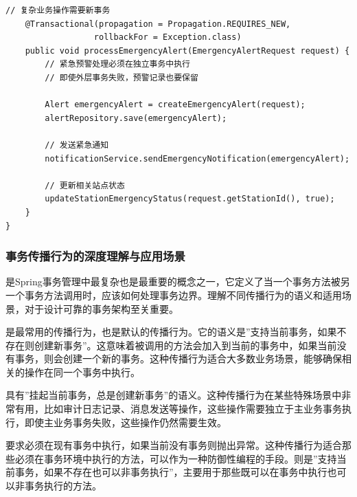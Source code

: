 \begin{lstlisting}[style=java]
    // 复杂业务操作需要新事务
    @Transactional(propagation = Propagation.REQUIRES_NEW, 
                  rollbackFor = Exception.class)
    public void processEmergencyAlert(EmergencyAlertRequest request) {
        // 紧急预警处理必须在独立事务中执行
        // 即使外层事务失败，预警记录也要保留
        
        Alert emergencyAlert = createEmergencyAlert(request);
        alertRepository.save(emergencyAlert);
        
        // 发送紧急通知
        notificationService.sendEmergencyNotification(emergencyAlert);
        
        // 更新相关站点状态
        updateStationEmergencyStatus(request.getStationId(), true);
    }
}
\end{lstlisting}

\hypertarget{ux4e8bux52a1ux4f20ux64adux884cux4e3aux7684ux6df1ux5ea6ux7406ux89e3ux4e0eux5e94ux7528ux573aux666f}{%
\subsubsection{事务传播行为的深度理解与应用场景}\label{ux4e8bux52a1ux4f20ux64adux884cux4e3aux7684ux6df1ux5ea6ux7406ux89e3ux4e0eux5e94ux7528ux573aux666f}}

是Spring事务管理中最复杂也是最重要的概念之一，它定义了当一个事务方法被另一个事务方法调用时，应该如何处理事务边界。理解不同传播行为的语义和适用场景，对于设计可靠的事务架构至关重要。

是最常用的传播行为，也是默认的传播行为。它的语义是''支持当前事务，如果不存在则创建新事务''。这意味着被调用的方法会加入到当前的事务中，如果当前没有事务，则会创建一个新的事务。这种传播行为适合大多数业务场景，能够确保相关的操作在同一个事务中执行。

具有''挂起当前事务，总是创建新事务''的语义。这种传播行为在某些特殊场景中非常有用，比如审计日志记录、消息发送等操作，这些操作需要独立于主业务事务执行，即使主业务事务失败，这些操作仍然需要生效。

要求必须在现有事务中执行，如果当前没有事务则抛出异常。这种传播行为适合那些必须在事务环境中执行的方法，可以作为一种防御性编程的手段。则是''支持当前事务，如果不存在也可以非事务执行''，主要用于那些既可以在事务中执行也可以非事务执行的方法。


